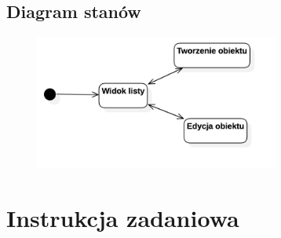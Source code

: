 \documentclass[a4paper,11pt]{article}
\begin{document}
\subsection{Diagram stanów}
\begin{figure}[H]
	\includegraphics[width=8cm]{StateDiagram}
	\centering
\end{figure}

\section{Instrukcja zadaniowa}
\end{document}
